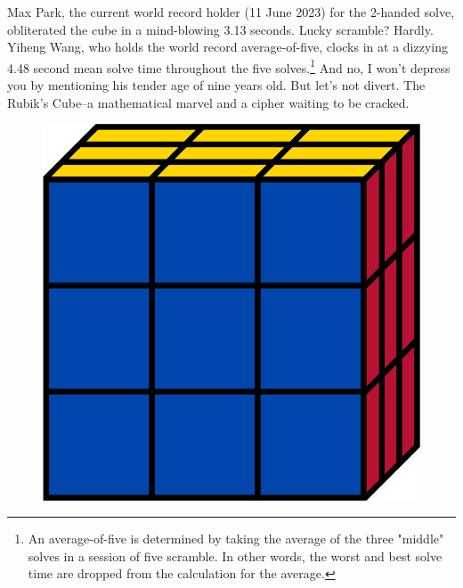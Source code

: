 \documentclass[12pt]{article}
\begin{document}
Max Park, the current world record holder (11 June 2023) for the 2-handed solve, obliterated the cube in a mind-blowing 3.13 seconds. Lucky scramble? Hardly. Yiheng Wang, who holds the world record average-of-five, clocks in at a dizzying 4.48 second mean solve time throughout the five solves.\footnote{An average-of-five is determined by taking the average of the three "middle" solves in a session of five scramble. In other words, the worst and best solve time are dropped from the calculation for the average.} And no, I won't depress you by mentioning his tender age of nine years old. But let's not divert. The Rubik's Cube--a mathematical marvel and a cipher waiting to be cracked. \\
\begin{figure}[h]
    \centering
    \begin{minipage}[c]{0.2\textwidth}
        \includegraphics[scale=0.1]{cube.png}
    \end{minipage}
    \begin{minipage}[c]{0.2\textwidth}

\end{minipage}
\end{figure}
\end{document}
